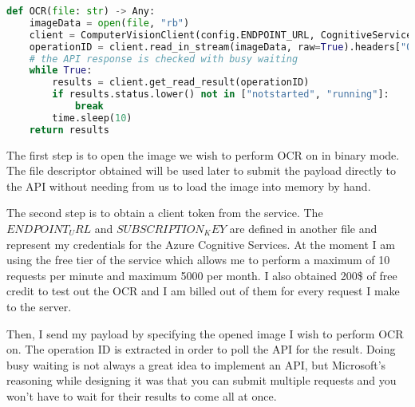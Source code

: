 \begin{lstlisting}[language=Python, label=code:read-api-ocr, caption={Read API OCR}]
def OCR(file: str) -> Any:
    imageData = open(file, "rb")
    client = ComputerVisionClient(config.ENDPOINT_URL, CognitiveServicesCredentials(config.SUBSCRIPTION_KEY))
    operationID = client.read_in_stream(imageData, raw=True).headers["Operation-Location"].split("/")[-1]
    # the API response is checked with busy waiting
    while True:
        results = client.get_read_result(operationID)
        if results.status.lower() not in ["notstarted", "running"]:
            break
        time.sleep(10)
    return results
\end{lstlisting}

The first step is to open the image we wish to perform OCR on in binary mode. The file descriptor obtained will be used later to submit the payload directly to the API without needing from us to load the image into memory by hand.

The second step is to obtain a client token from the service. The $ENDPOINT_URL$ and $SUBSCRIPTION_KEY$ are defined in another file and represent my credentials for the Azure Cognitive Services. At the moment I am using the free tier of the service which allows me to perform a maximum of 10 requests per minute and maximum 5000 per month. I also obtained 200\$ of free credit to test out the OCR and I am billed out of them for every request I make to the server.

Then, I send my payload by specifying the opened image I wish to perform OCR on. The operation ID is extracted in order to poll the API for the result. Doing busy waiting is not always a great idea to implement an API, but Microsoft's reasoning while designing it was that you can submit multiple requests and you won't have to wait for their results to come all at once.


